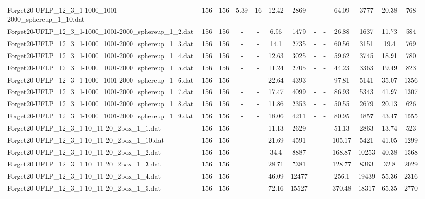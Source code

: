 \begin{table}[!ht]
{\begin{tabular}{lcccccccccccc}
Forget20-UFLP\_12\_3\_1-1000\_1001-2000\_sphereup\_1\_10.dat & 156 & 156 & 5.39 & 16 & 12.42 & 2869 &  - &  - & 64.09 & 3777 & 20.38 & 768 \\
Forget20-UFLP\_12\_3\_1-1000\_1001-2000\_sphereup\_1\_2.dat & 156 & 156 &  - &  - & 6.96 & 1479 &  - &  - & 26.88 & 1637 & 11.73 & 584 \\
Forget20-UFLP\_12\_3\_1-1000\_1001-2000\_sphereup\_1\_3.dat & 156 & 156 &  - &  - & 14.1 & 2735 &  - &  - & 60.56 & 3151 & 19.4 & 769 \\
Forget20-UFLP\_12\_3\_1-1000\_1001-2000\_sphereup\_1\_4.dat & 156 & 156 &  - &  - & 12.63 & 3025 &  - &  - & 59.62 & 3745 & 18.91 & 780 \\
Forget20-UFLP\_12\_3\_1-1000\_1001-2000\_sphereup\_1\_5.dat & 156 & 156 &  - &  - & 11.24 & 2705 &  - &  - & 44.23 & 3363 & 19.49 & 823 \\
Forget20-UFLP\_12\_3\_1-1000\_1001-2000\_sphereup\_1\_6.dat & 156 & 156 &  - &  - & 22.64 & 4393 &  - &  - & 97.81 & 5141 & 35.07 & 1356 \\
Forget20-UFLP\_12\_3\_1-1000\_1001-2000\_sphereup\_1\_7.dat & 156 & 156 &  - &  - & 17.47 & 4099 &  - &  - & 86.93 & 5343 & 41.97 & 1307 \\
Forget20-UFLP\_12\_3\_1-1000\_1001-2000\_sphereup\_1\_8.dat & 156 & 156 &  - &  - & 11.86 & 2353 &  - &  - & 50.55 & 2679 & 20.13 & 626 \\
Forget20-UFLP\_12\_3\_1-1000\_1001-2000\_sphereup\_1\_9.dat & 156 & 156 &  - &  - & 18.06 & 4211 &  - &  - & 80.95 & 4857 & 43.47 & 1555 \\
Forget20-UFLP\_12\_3\_1-10\_11-20\_2box\_1\_1.dat & 156 & 156 &  - &  - & 11.13 & 2629 &  - &  - & 51.13 & 2863 & 13.74 & 523 \\
Forget20-UFLP\_12\_3\_1-10\_11-20\_2box\_1\_10.dat & 156 & 156 &  - &  - & 21.69 & 4591 &  - &  - & 105.17 & 5421 & 41.05 & 1299 \\
Forget20-UFLP\_12\_3\_1-10\_11-20\_2box\_1\_2.dat & 156 & 156 &  - &  - & 34.4 & 8887 &  - &  - & 168.87 & 10253 & 40.38 & 1568 \\
Forget20-UFLP\_12\_3\_1-10\_11-20\_2box\_1\_3.dat & 156 & 156 &  - &  - & 28.71 & 7381 &  - &  - & 128.77 & 8363 & 32.8 & 2029 \\
Forget20-UFLP\_12\_3\_1-10\_11-20\_2box\_1\_4.dat & 156 & 156 &  - &  - & 46.09 & 12477 &  - &  - & 256.1 & 19439 & 55.36 & 2316 \\
Forget20-UFLP\_12\_3\_1-10\_11-20\_2box\_1\_5.dat & 156 & 156 &  - &  - & 72.16 & 15527 &  - &  - & 370.48 & 18317 & 65.35 & 2770 \\

\end{tabular}}
\end{table}
